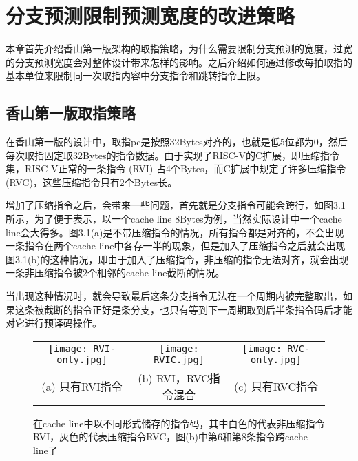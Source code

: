 \chapter{分支预测限制预测宽度的改进策略}

本章首先介绍香山第一版架构的取指策略，为什么需要限制分支预测的宽度，过宽的分支预测宽度会对整体设计带来怎样的影响。之后介绍如何通过修改每拍取指的基本单位来限制同一次取指内容中分支指令和跳转指令上限。

\section{香山第一版取指策略}

在香山第一版的设计中，取指pc是按照32Bytes对齐的，也就是低5位都为0，然后每次取指固定取32Bytes的指令数据。由于实现了RISC-V的C扩展，即压缩指令集，RISC-V正常的一条指令 (RVI) 占4个Bytes，而C扩展中规定了许多压缩指令 (RVC)，这些压缩指令只有2个Bytes长。

增加了压缩指令之后，会带来一些问题，首先就是分支指令可能会跨行，如图3.1所示，为了便于表示，以一个cache line 8Bytes为例，当然实际设计中一个cache line会大得多。图3.1(a)是不带压缩指令的情况，所有指令都是对齐的，不会出现一条指令在两个cache line中各存一半的现象，但是加入了压缩指令之后就会出现图3.1(b)的这种情况，即由于加入了压缩指令，非压缩的指令无法对齐，就会出现一条非压缩指令被2个相邻的cache line截断的情况。

当出现这种情况时，就会导致最后这条分支指令无法在一个周期内被完整取出，如果这条被截断的指令正好是条分支，也只有等到下一周期取到后半条指令码后才能对它进行预译码操作。

\begin{figure}[htb]
    \centering
    \setlength\tabcolsep{3pt}  %
    \vspace{5pt} %
    \begin{tabular}{ccc}
        \texttt{[image: RVI-only.jpg]} &
        \texttt{[image: RVIC.jpg]} &
        \texttt{[image: RVC-only.jpg]} \\
        (a) 只有RVI指令 & (b) RVI，RVC指令混合 & (c) 只有RVC指令 \\[1ex]
    \end{tabular}
    \caption{在cache line中以不同形式储存的指令码，其中白色的代表非压缩指令RVI，灰色的代表压缩指令RVC，图(b)中第6和第8条指令跨cache line了}
    \label{fig:figure1}
\end{figure}

